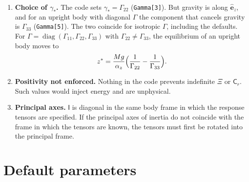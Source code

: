 \documentclass[11pt]{article}
\newcommand{\vect}[1]{\bm{#1}}
\newcommand{\tens}[1]{\mathsf{#1}}
\newcommand{\ez}{\hat{\vect{e}}_z}
\theoremstyle{remark}
\begin{document}
\begin{enumerate}
  \item \textbf{Choice of $\gamma_\ast$.}
        \label{rem:gamma22}
        The code sets $\gamma_\ast=\Gamma_{22}$ (\texttt{Gamma[3]}). But
        gravity is along $\ez$, and for an upright body with diagonal
        $\tens{\Gamma}$ the component that cancels gravity is
        $\Gamma_{33}$ (\texttt{Gamma[5]}). The two coincide for isotropic
        $\tens{\Gamma}$, including the defaults. For
        $\tens{\Gamma}=\operatorname{diag}(\Gamma_{11},\Gamma_{22},\Gamma_{33})$
        with $\Gamma_{22}\neq\Gamma_{33}$, the equilibrium of an upright
        body moves to
        \begin{equation}
          z^\ast=\frac{Mg}{\alpha_z}\Bigl(\frac{1}{\Gamma_{22}}-\frac{1}{\Gamma_{33}}\Bigr).
        \end{equation}

  \item \textbf{Positivity not enforced.} Nothing in the code prevents
        indefinite $\tens{\Xi}$ or $\tens{C}_r$. Such values would inject
        energy and are unphysical.

  \item \textbf{Principal axes.} $\tens{I}$ is diagonal in the same body
        frame in which the response tensors are specified. If the
        principal axes of inertia do not coincide with the frame in which
        the tensors are known, the tensors must first be rotated into the
        principal frame.
\end{enumerate}

\appendix
\section{Default parameters}
\end{document}
